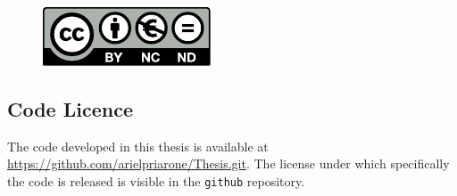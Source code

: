 \begin{figure}
    \centering
    \includegraphics{images/CreativeCommons/by-nc-nd.eu.pdf}
\end{figure}

\subsection{Code Licence}
The code developed in this thesis is available at \url{https://github.com/arielpriarone/Thesis.git}. The license under which specifically the code is released is visible in the \texttt{github} repository.